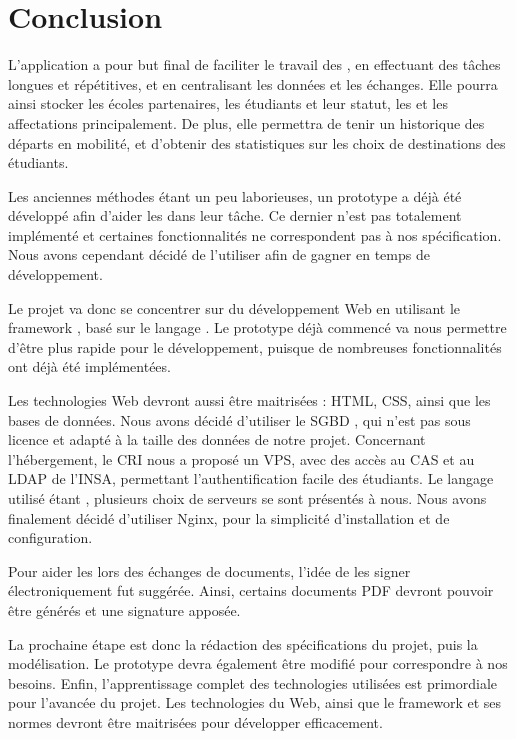 
	\chapter*{Conclusion}

L'application a pour but final de faciliter le travail des \ris, en effectuant des tâches longues et répétitives, et en centralisant les données et les échanges. Elle pourra ainsi stocker les écoles partenaires, les étudiants et leur statut, les \voe et les affectations principalement. De plus, elle permettra de tenir un historique des départs en mobilité, et d'obtenir des statistiques sur les choix de destinations des étudiants. 

\medbreak

Les anciennes méthodes étant un peu laborieuses, un prototype a déjà été développé afin d'aider les \ris dans leur tâche. Ce dernier n'est pas totalement implémenté et certaines fonctionnalités ne correspondent pas à nos spécification. Nous avons cependant décidé de l'utiliser afin de gagner en temps de développement.

Le projet va donc se concentrer sur du développement Web en utilisant le framework \symfony, basé sur le langage \php.
Le prototype déjà commencé va nous permettre d'être plus rapide pour le développement, puisque de nombreuses fonctionnalités ont déjà été implémentées. 

Les technologies Web devront aussi être maitrisées : HTML, CSS, ainsi que les bases de données. Nous avons décidé d'utiliser le SGBD \mdb, qui n'est pas sous licence et adapté à la taille des données de notre projet. Concernant l'hébergement, le CRI nous a proposé un VPS, avec des accès au CAS et au LDAP de l'INSA, permettant l'authentification facile des étudiants. Le langage utilisé étant \php, plusieurs choix de serveurs se sont présentés à nous. Nous avons finalement décidé d'utiliser Nginx, pour la simplicité d'installation et de configuration.

Pour aider les \ris lors des échanges de documents, l'idée de les signer électroniquement fut suggérée. Ainsi, certains documents PDF devront pouvoir être générés et une signature apposée. 

\medbreak

La prochaine étape est donc la rédaction des spécifications du projet, puis la modélisation. Le prototype devra également être modifié pour correspondre à nos besoins. Enfin, l'apprentissage complet des technologies utilisées est primordiale pour l'avancée du projet. Les technologies du Web, ainsi que le framework \symfony et ses normes devront être maitrisées pour développer efficacement.